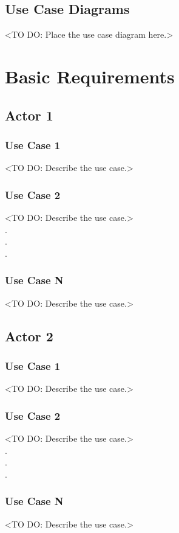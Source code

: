 \documentclass[12pt,a4paper]{report}
\begin{document}
\section{Use Case Diagrams}
<TO DO: Place the use case diagram here.>
\chapter{Basic Requirements}
\section{Actor 1}
\subsection{Use Case 1}
<TO DO: Describe the use case.>
\subsection{Use Case 2}
<TO DO: Describe the use case.> \\
\hspace*{3cm} . \\
\hspace*{3cm} . \\
\hspace*{3cm} .
\subsection{Use Case N}
<TO DO: Describe the use case.>

\section{Actor 2} 
\subsection{Use Case 1}
<TO DO: Describe the use case.>
\subsection{Use Case 2}
<TO DO: Describe the use case.> \\
\hspace*{3cm} . \\
\hspace*{3cm} . \\
\hspace*{3cm} .
\subsection{Use Case N}
<TO DO: Describe the use case.>
\end{document}

